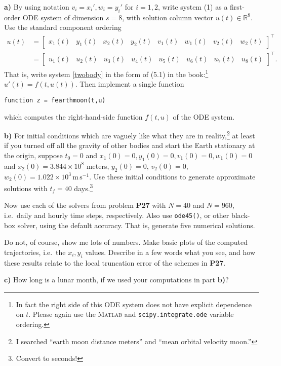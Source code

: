 \documentclass[12pt]{amsart}
\newcommand{\RR}{\mathbb{R}}
\newcommand{\Matlab}{\textsc{Matlab}\xspace}
\newcommand{\epart}[1]{\medskip\noindent\textbf{#1)}\quad }
\begin{document}
\epart{a} By using notation $v_i=x_i', w_i=y_i'$ for $i=1,2$, write system (1) as a first-order ODE system of dimension $s=8$, with solution column vector $u(t)\in\RR^8$.  Use the standard component ordering
\begin{align*}
u(t) &= \begin{bmatrix} x_1(t) & y_1(t) & x_2(t) & y_2(t) & v_1(t) & w_1(t) & v_2(t) & w_2(t) \end{bmatrix}^\top \\
     &= \begin{bmatrix} u_1(t) & u_2(t) & u_3(t) & u_4(t) & u_5(t) & u_6(t) & u_7(t) & u_8(t) \end{bmatrix}^\top.
\end{align*}
That is, write system \eqref{twobody} in the form of (5.1) in the book:\footnote{In fact the right side of this ODE system does not have explicit dependence on $t$.  Please again use the \Matlab and \texttt{scipy.integrate.ode} variable ordering.} $u'(t) = f(t,u(t))$.  Then implement a single function

\centerline{\texttt{function z = fearthmoon(t,u)}}

\noindent which computes the right-hand-side function $f(t,u)$ of the ODE system.

\epart{b}  For initial conditions which are vaguely like what they are in reality,\footnote{I searched ``earth moon distance meters'' and ``mean orbital velocity moon.''} at least if you turned off all the gravity of other bodies and start the Earth stationary at the origin, suppose $t_0=0$ and $x_1(0)=0,y_1(0)=0,v_1(0)=0,w_1(0)=0$ and $x_2(0)=3.844\times 10^8$ meters, $y_2(0)=0$, $v_2(0)=0$, $w_2(0)=1.022\times 10^3 \,\text{m}\,\text{s}^{-1}$.  Use these initial conditions to generate approximate solutions with $t_f=40$ days.\footnote{Convert to seconds!}

Now use each of the solvers from problem \textbf{P27} with $N=40$ and $N=960$, i.e.~daily and hourly time steps, respectively.  Also use \texttt{ode45()}, or other black-box solver, using the default accuracy.  That is, generate five numerical solutions.

Do not, of course, show me lots of numbers.  Make basic plots of the computed trajectories, i.e.~the $x_i,y_i$ values.  Describe in a few words what you see, and how these results relate to the local truncation error of the schemes in \textbf{P27}.

\epart{c}  How long is a lunar month, if we used your computations in part \textbf{b)}?  
\end{document}
